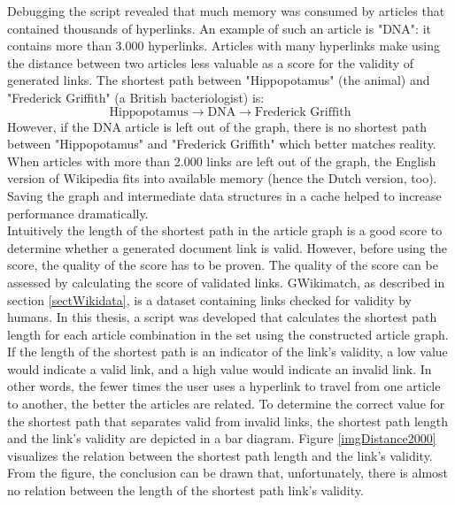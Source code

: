 Debugging the script revealed that much memory was consumed by articles that contained thousands of hyperlinks. An example of such an article is "DNA": it contains more than 3.000 hyperlinks. Articles with many hyperlinks make using the distance between two articles less valuable as a score for the validity of generated links. The shortest path between "Hippopotamus" (the animal) and "Frederick Griffith" (a British bacteriologist) is: $$ \text{Hippopotamus} \longrightarrow \text{DNA} \longrightarrow \text{Frederick\ Griffith}$$
However, if the DNA article is left out of the graph, there is no shortest path between "Hippopotamus" and "Frederick Griffith" which better matches reality. \\
When articles with more than 2.000 %
 links are left out of the graph, the English version of Wikipedia fits into available memory (hence the Dutch version, too). Saving the graph and intermediate data structures in a cache helped to increase performance dramatically.\\
 
 Intuitively the length of the shortest path in the article graph is a good score to determine whether a generated document link is valid. However, before using the score, the quality of the score has to be proven. The quality of the score can be assessed by calculating the score of validated links. GWikimatch, as described in section \ref{sectWikidata}, is a dataset containing links checked for validity by humans. In this thesis, a script was developed that calculates the shortest path length for each article combination in the set using the constructed article graph. \\

If the length of the shortest path is an indicator of the link's validity, a low value would indicate a valid link, and a high value would indicate an invalid link. In other words, the fewer times the user uses a hyperlink to travel from one article to another, the better the articles are related. To determine the correct value for the shortest path that separates valid from invalid links, the shortest path length and the link's validity are depicted in a bar diagram. Figure \ref{imgDistance2000} visualizes the relation between the shortest path length and the link's validity. From the figure, the conclusion can be drawn that, unfortunately, there is almost no relation between the length of the shortest path link's validity.\\


